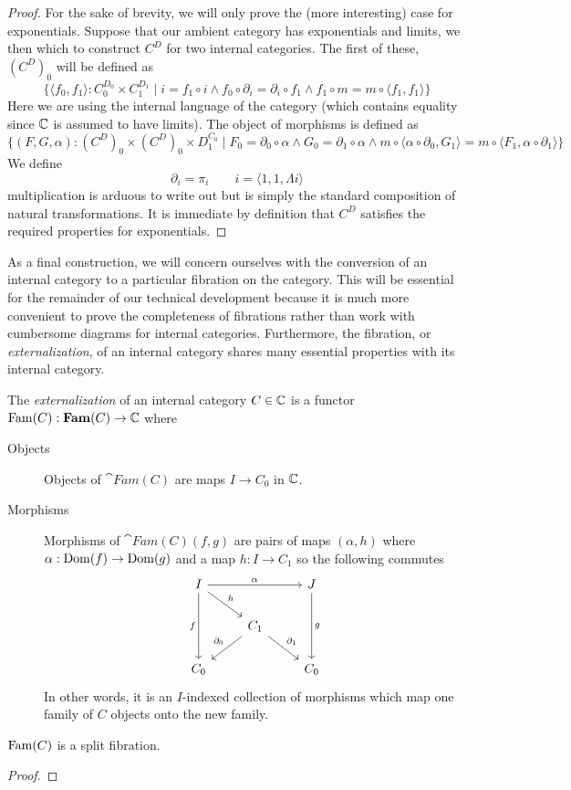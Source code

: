 \begin{proof}
  For the sake of brevity, we will only prove the (more interesting)
  case for exponentials. Suppose that our ambient category has
  exponentials and limits, we then which to construct $C^D$ for two
  internal categories. The first of these, $(C^D)_0$ will be defined
  as
  \[
    \{\langle f_0, f_1 \rangle : C_0^{D_0} \times C_1^{D_1} \mid
    i = f_1 \circ i \mathrel{\wedge} f_0 \circ \partial_i = \partial_i \circ f_1
    \mathrel{\wedge} f_1 \circ m = m \circ \langle f_1, f_1 \rangle \}
  \]
  Here we are using the internal language of the category (which
  contains equality since $\mathbb{C}$ is assumed to have limits). The
  object of morphisms is defined as
  \[
    \{(F, G, \alpha) : (C^D)_0 \times (C^D)_0 \times D_1^{C_0} \mid
    F_0 = \partial_0 \circ \alpha \mathrel{\wedge} G_0 = \partial_1 \circ \alpha
    \mathrel{\wedge}
    m \circ \langle \alpha \circ \partial_0, G_1 \rangle = m \circ \langle F_1, \alpha \circ \partial_1 \rangle\}
  \]
  We define
  \[
    \partial_i = \pi_i \qquad
    i = \langle 1, 1, \Lambda i \rangle
  \]
  multiplication is arduous to write out but is simply the standard
  composition of natural transformations. It is immediate by
  definition that $C^D$ satisfies the required properties for
  exponentials.
\end{proof}
As a final construction, we will concern ourselves with the conversion
of an internal category to a particular fibration on the
category. This will be essential for the remainder of our technical
development because it is much more convenient to prove the
completeness of fibrations rather than work with cumbersome diagrams
for internal categories. Furthermore, the fibration, or
\emph{externalization}, of an internal category shares many essential
properties with its internal category.
\begin{defn}\label{defn:internal:externalization}
  The \emph{externalization} of an internal category $C \in \mathbb{C}$ is
  a functor $\operatorname{Fam}(C) : \mathbf{Fam}(C) \to \mathbb{C}$ where
  \begin{description}
  \item[Objects] Objects of $\cat{Fam}(C)$ are maps $I \to C_0$ in
    $\mathbb{C}$.
  \item[Morphisms] Morphisms of $\cat{Fam}(C)(f, g)$ are pairs of maps
    $(\alpha, h)$ where $\alpha : \operatorname{Dom}(f) \to \operatorname{Dom}(g)$ and a map $h :
    I \to C_1$ so the following commutes
    \[
      \begin{tikzcd}
        I \ar[dd, swap, "f"] \ar[rd, "h"] \ar[rr, "\alpha"] && J \ar[dd, "g"]\\
        & C_1 \ar[dl, swap, "\partial_0"] \ar[dr, "\partial_1"] &\\
        C_0 && C_0
      \end{tikzcd}
    \]
    In other words, it is an $I$-indexed collection of morphisms which
    map one family of $C$ objects onto the new family.
  \end{description}
\end{defn}

\begin{thm}\label{thm:internal:externalization}
  $\operatorname{Fam}(C)$ is a split fibration.
\end{thm}
\begin{proof}
\end{proof}

